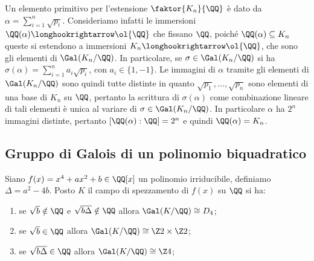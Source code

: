\documentclass[11pt]{scrartcl}
\begin{document}
\begin{remark}
    Un elemento primitivo per l'estensione $\faktor{K_n}{\QQ}$ è dato da 
    $\alpha =\displaystyle \sum_{i = 1}^n \sqrt{p_i}$. Consideriamo infatti le immersioni
    $\QQ(\alpha) \longhookrightarrow \ol{\QQ}$ che fissano $\QQ$, poiché 
    $\QQ(\alpha) \subseteq K_n$ queste si estendono a immersioni
    $K_n \longhookrightarrow \ol{\QQ}$, che sono gli elementi di $\Gal(K_n/\QQ)$.
    In particolare, se $\sigma \in \Gal(K_n/\QQ)$ si ha 
    $\sigma(\alpha) = \displaystyle\sum_{i = 1}^n a_i\sqrt{p_i}$, con $a_i \in \{1, -1\}$.
    Le immagini di $\alpha$ tramite gli elementi di $\Gal(K_n/\QQ)$ sono 
    quindi tutte distinte in quanto $\sqrt{p_1}, \ldots, \sqrt{p_n}$ sono
    elementi di una base di $K_n$ su $\QQ$, pertanto la scrittura di $\sigma(\alpha)$
    come combinazione lineare di tali elementi è unica al variare di 
    $\sigma \in \Gal(K_n/\QQ)$. In particolare $\alpha$ ha $2^n$ immagini distinte,
    pertanto $[\QQ(\alpha): \QQ] = 2^n$ e quindi $\QQ(\alpha) = K_n$.
\end{remark}

\newpage

\subsection{Gruppo di Galois di un polinomio biquadratico}

\begin{theorem}
    Siano $f(x) = x^4 + ax^2 + b \in \QQ[x]$ un polinomio irriducibile, definiamo $\Delta = a^2 - 4b$.
    Posto $K$ il campo di spezzamento di $f(x)$ su $\QQ$ si ha:
    \begin{enumerate}[(1)]
        \item se $\sqrt{b} \notin \QQ$ e $\sqrt{b\Delta} \notin \QQ$ allora $\Gal(K/\QQ) \cong D_4$;
        \item se $\sqrt{b} \in \QQ$ allora $\Gal(K/\QQ) \cong \Z2\times\Z2$;
        \item se $\sqrt{b\Delta}\in\QQ$ allora $\Gal(K/\QQ) \cong \Z4$;
    \end{enumerate}
\end{theorem}
\end{document}
